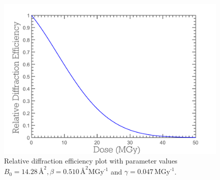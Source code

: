 \begin{figure}
  \centering
    \includegraphics[width=1\textwidth]{figures/zde/RDEPlot_zde.pdf}
    \caption{Relative diffraction efficiency plot with parameter values $B_0 = 14.28\,\text{\AA}^2, \beta = 0.510\,\text{\AA}^2 \text{MGy}^{\text{-1}}$ and $\gamma = 0.047\,\text{MGy}^{\text{-1}}$.}
    \label{fig:Relative diffraction efficiency plot - ZDE}
\end{figure}

